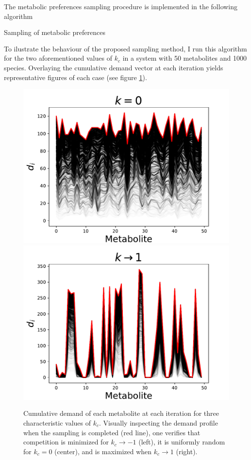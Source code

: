 \documentclass[12pt]{article}
\begin{document}
	The metabolic preferences sampling procedure is implemented in the following algorithm\\[10pt]
	\begin{algorithm}[H]
		\SetAlgoLined
		\caption{Sampling of metabolic preferences}
	\end{algorithm}
	\vspace{10pt}
	To ilustrate the behaviour of the proposed sampling method, I run this algorithm for the two aforementioned values of $ k_c $ in a system with 50 metabolites and 1000 species. Overlaying the cumulative demand vector at each iteration yields representative figures of each case (see figure \ref{demand_profiles}).\\
	\begin{figure}
		\centering
		\includegraphics[width=.5\textwidth]{competition_k_0.pdf}\hfill
		\includegraphics[width=.5\textwidth]{competition_k_1.pdf}
		\caption{Cumulative demand of each metabolite at each iteration for three characteristic values of $ k_c $. Visually inspecting the demand profile when the sampling is completed (red line), one verifies that competition is minimized for $ k_c \rightarrow -1 $ (left),  it is uniformly random for $ k_c = 0 $ (center), and is maximized when $  k_c \rightarrow 1$ (right).}
		\label{demand_profiles}
	\end{figure}
\end{document}
